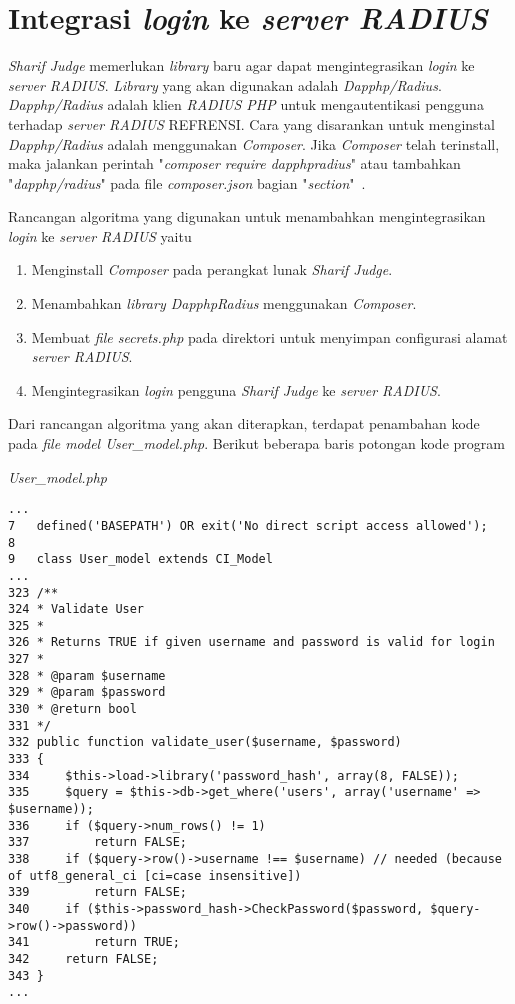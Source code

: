 \section{Integrasi \textit{login} ke \textit{server RADIUS}}
\textit{Sharif Judge} memerlukan \textit{library} baru agar dapat mengintegrasikan \textit{login} ke \textit{server RADIUS}. \textit{Library} yang akan digunakan adalah \textit{Dapphp/Radius}. \textit{Dapphp/Radius} adalah klien \textit{RADIUS PHP} untuk mengautentikasi pengguna terhadap \textit{server RADIUS} REFRENSI. Cara yang disarankan untuk menginstal \textit{Dapphp/Radius} adalah menggunakan \textit{Composer}. Jika \textit{Composer} telah terinstall, maka jalankan perintah "\textit{composer require dapphpradius}" atau tambahkan "\textit{dapphp/radius}" pada file \textit{composer.json} bagian "\textit{section}"~\cite{drew:16:radius}.

Rancangan algoritma yang digunakan untuk menambahkan mengintegrasikan \textit{login} ke \textit{server RADIUS} yaitu
\begin{enumerate}
	\item Menginstall \textit{Composer} pada perangkat lunak \textit{Sharif Judge}.
	\item Menambahkan \textit{library DapphpRadius} menggunakan \textit{Composer}.
	\item Membuat \textit{file secrets.php} pada direktori  untuk menyimpan configurasi alamat \textit{server RADIUS}.
	\item Mengintegrasikan \textit{login} pengguna \textit{Sharif Judge} ke \textit{server RADIUS}.
\end{enumerate}

Dari rancangan algoritma yang akan diterapkan, terdapat penambahan kode pada \textit{file model User\_model.php}. Berikut beberapa baris potongan kode program

\textit{User\_model.php}
\begin{lstlisting}[basicstyle=\ttfamily, frame=single,
columns=fullflexible, keepspaces=true, breaklines=true]
...
7	defined('BASEPATH') OR exit('No direct script access allowed');
8
9	class User_model extends CI_Model
...
323	/**
324	* Validate User
325	*
326	* Returns TRUE if given username and password is valid for login
327	*
328	* @param $username
329	* @param $password
330	* @return bool
331	*/
332	public function validate_user($username, $password)
333	{
334		$this->load->library('password_hash', array(8, FALSE));
335		$query = $this->db->get_where('users', array('username' => $username));
336		if ($query->num_rows() != 1)
337			return FALSE;
338		if ($query->row()->username !== $username) // needed (because of utf8_general_ci [ci=case insensitive])
339			return FALSE;
340		if ($this->password_hash->CheckPassword($password, $query->row()->password))
341			return TRUE;
342		return FALSE;
343	}
...
\end{lstlisting}

